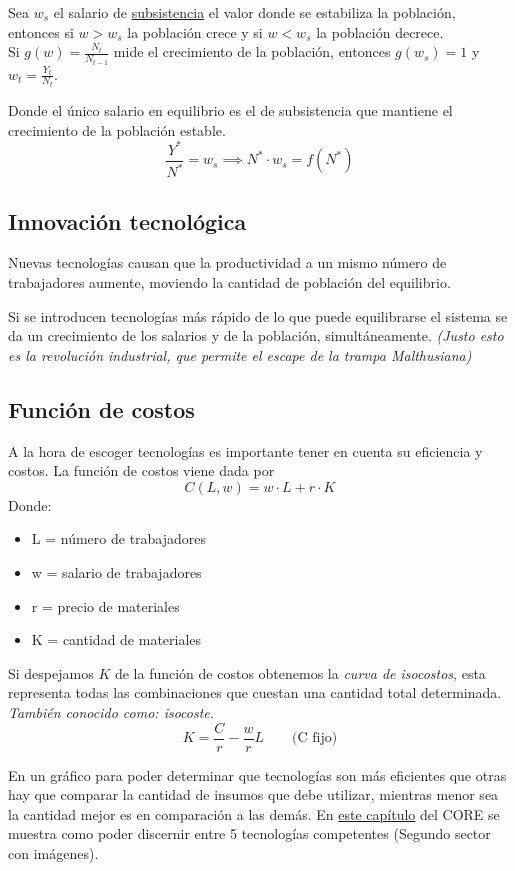 Sea $w_s$ el salario de \hyperlink{subsistencia}{subsistencia} el valor donde se estabiliza la población, entonces si $w > w_s$ la población crece y si $w < w_s$ la población decrece. 
\\

Si $g(w) = \frac{N_t}{N_{t-1}}$ mide el crecimiento de la población, entonces $g(w_s) = 1$ y $w_t = \frac{Y_t}{N_t}$.

Donde el único salario en equilibrio es el de subsistencia que mantiene el crecimiento de la población estable. \[\frac{Y^*}{N^*} = w_s \implies N^*\cdot w_s = f(N^*)\]

\subsection{Innovación tecnológica}
Nuevas tecnologías causan que la productividad a un mismo número de trabajadores aumente, moviendo la cantidad de población del equilibrio.

Si se introducen tecnologías más rápido de lo que puede equilibrarse el sistema se da un crecimiento de los salarios y de la población, simultáneamente. \textit{(Justo esto es la revolución industrial, que permite el escape de la trampa Malthusiana)}

\subsection{Función de costos}
A la hora de escoger tecnologías es importante tener en cuenta su eficiencia y costos. La función de costos viene dada por
\[C(L, w) = w \cdot L + r\cdot K\]
Donde:
\begin{itemize}
    \item L = número de trabajadores
    \item w = salario de trabajadores
    \item r = precio de materiales
    \item K = cantidad de materiales
\end{itemize}


Si despejamos $K$ de la función de costos obtenemos la \textit{curva de isocostos}, esta representa todas las combinaciones que cuestan una cantidad total determinada. \textit{También conocido como: isocoste.}
\[K = \frac{C}{r} - \frac{w}{r}L\quad \quad \text{(C fijo)}\]


En un gráfico para poder determinar que tecnologías son más eficientes que otras hay que comparar la cantidad de insumos que debe utilizar, mientras menor sea la cantidad mejor es en comparación a las demás. En \href{https://www.core-econ.org/the-economy/book/es/text/02.html#qué-es-una-tecnolog}{este capítulo} del CORE se muestra como poder discernir entre 5 tecnologías competentes (Segundo sector con imágenes). 


